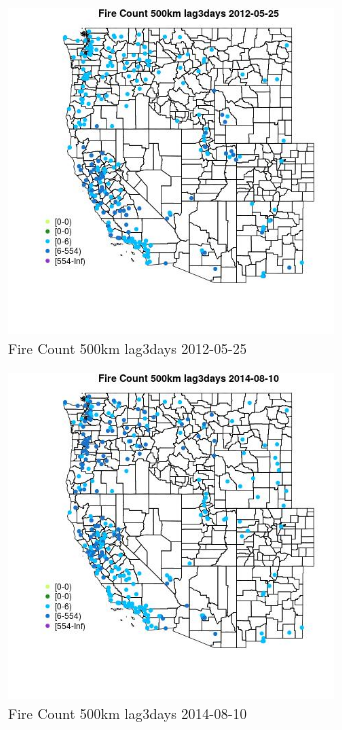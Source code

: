 \begin{figure} 
\centering  
\includegraphics[width=0.77\textwidth]{Code_Outputs/Report_ML_input_PM25_Step4_part_e_de_duplicated_aves_compiled_2019-05-18wNAs_MapObsFire_Count_500km_lag3days2012-05-25.jpg} 
\caption{\label{fig:Report_ML_input_PM25_Step4_part_e_de_duplicated_aves_compiled_2019-05-18wNAsMapObsFire_Count_500km_lag3days2012-05-25}Fire Count 500km lag3days 2012-05-25} 
\end{figure} 
 

\begin{figure} 
\centering  
\includegraphics[width=0.77\textwidth]{Code_Outputs/Report_ML_input_PM25_Step4_part_e_de_duplicated_aves_compiled_2019-05-18wNAs_MapObsFire_Count_500km_lag3days2014-08-10.jpg} 
\caption{\label{fig:Report_ML_input_PM25_Step4_part_e_de_duplicated_aves_compiled_2019-05-18wNAsMapObsFire_Count_500km_lag3days2014-08-10}Fire Count 500km lag3days 2014-08-10} 
\end{figure} 
 

